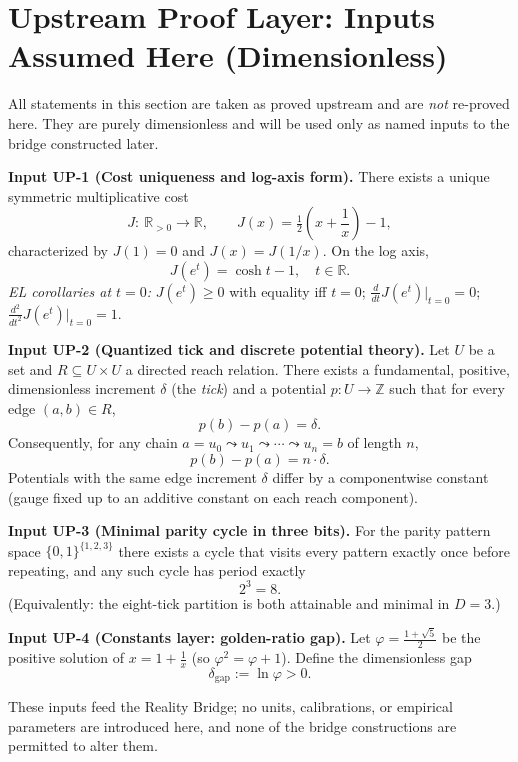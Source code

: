 \documentclass[11pt]{article}
\theoremstyle{plain}
\theoremstyle{definition}
\theoremstyle{remark}
\begin{document}
\section{Upstream Proof Layer: Inputs Assumed Here (Dimensionless)}
All statements in this section are taken as proved upstream and are \emph{not} re-proved here. They are purely dimensionless and will be used only as named inputs to the bridge constructed later.

\medskip
\noindent\textbf{Input UP-1 (Cost uniqueness and log-axis form).}
There exists a unique symmetric multiplicative cost
\[
J:\ \mathbb{R}_{>0}\to\mathbb{R},\qquad
J(x)=\tfrac12\!\left(x+\frac{1}{x}\right)-1,
\]
characterized by \(J(1)=0\) and \(J(x)=J(1/x)\). On the log axis,
\[
J(e^{t})=\cosh t-1,\quad t\in\mathbb{R}.
\]
\emph{EL corollaries at \(t=0\):} \(J(e^{t})\ge 0\) with equality iff \(t=0\); \(\frac{d}{dt}J(e^{t})\big|_{t=0}=0\); \(\frac{d^{2}}{dt^{2}}J(e^{t})\big|_{t=0}=1\).

\medskip
\noindent\textbf{Input UP-2 (Quantized tick and discrete potential theory).}
Let \(U\) be a set and \(R\subseteq U\times U\) a directed reach relation. There exists a fundamental, positive, dimensionless increment \(\delta\) (the \emph{tick}) and a potential \(p:U\to\mathbb{Z}\) such that for every edge \((a,b)\in R\),
\[
p(b)-p(a)=\delta.
\]
Consequently, for any chain \(a=u_{0}\leadsto u_{1}\leadsto\cdots\leadsto u_{n}=b\) of length \(n\),
\[
p(b)-p(a)=n\cdot\delta.
\]
Potentials with the same edge increment \(\delta\) differ by a componentwise constant (gauge fixed up to an additive constant on each reach component).

\medskip
\noindent\textbf{Input UP-3 (Minimal parity cycle in three bits).}
For the parity pattern space \(\{0,1\}^{\{1,2,3\}}\) there exists a cycle that visits every pattern exactly once before repeating, and any such cycle has period exactly
\[
2^{3}=8.
\]
(Equivalently: the eight-tick partition is both attainable and minimal in \(D=3\).)

\medskip
\noindent\textbf{Input UP-4 (Constants layer: golden-ratio gap).}
Let \(\varphi=\tfrac{1+\sqrt{5}}{2}\) be the positive solution of \(x=1+\tfrac{1}{x}\) (so \(\varphi^{2}=\varphi+1\)). Define the dimensionless gap
\[
\delta_{\mathrm{gap}}:=\ln\varphi>0.
\]

\medskip
\noindent These inputs feed the Reality Bridge; no units, calibrations, or empirical parameters are introduced here, and none of the bridge constructions are permitted to alter them.
\end{document}

